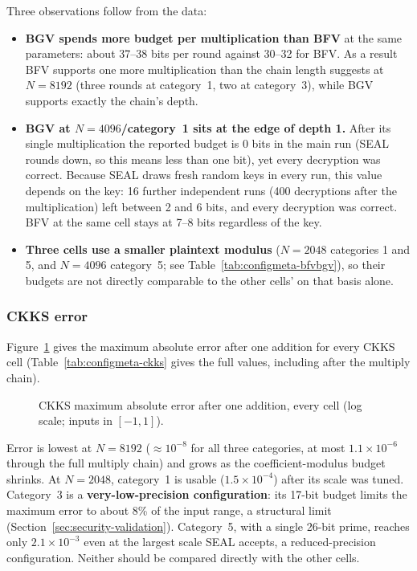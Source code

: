 Three observations follow from the data:
\begin{itemize}[leftmargin=*, itemsep=2pt]
  \item \textbf{BGV spends more budget per multiplication than BFV} at the same parameters: about 37--38 bits per round against 30--32 for BFV. As a result BFV supports one more multiplication than the chain length suggests at $N{=}8192$ (three rounds at category~1, two at category~3), while BGV supports exactly the chain's depth.
  \item \textbf{BGV at $N{=}4096$/category~1 sits at the edge of depth 1.} After its single multiplication the reported budget is 0 bits in the main run (SEAL rounds down, so this means less than one bit), yet every decryption was correct. Because SEAL draws fresh random keys in every run, this value depends on the key: 16 further independent runs (400 decryptions after the multiplication) left between 2 and 6 bits, and every decryption was correct. BFV at the same cell stays at 7--8 bits regardless of the key.
  \item \textbf{Three cells use a smaller plaintext modulus} ($N{=}2048$ categories 1 and 5, and $N{=}4096$ category~5; see Table~\ref{tab:configmeta-bfvbgv}), so their budgets are not directly comparable to the other cells' on that basis alone.
\end{itemize}

\subsubsection*{CKKS error}

Figure~\ref{fig:ckkserror} gives the maximum absolute error after one addition for every CKKS cell (Table~\ref{tab:configmeta-ckks} gives the full values, including after the multiply chain).

\begin{figure}[h!]
\centering

\caption{CKKS maximum absolute error after one addition, every cell (log scale; inputs in $[-1,1]$).}
\label{fig:ckkserror}
\end{figure}

Error is lowest at $N{=}8192$ ($\approx 10^{-8}$ for all three categories, at most $1.1{\times}10^{-6}$ through the full multiply chain) and grows as the coefficient-modulus budget shrinks. At $N{=}2048$, category~1 is usable ($1.5{\times}10^{-4}$) after its scale was tuned. Category~3 is a \textbf{very-low-precision configuration}: its 17-bit budget limits the maximum error to about 8\% of the input range, a structural limit (Section~\ref{sec:security-validation}). Category~5, with a single 26-bit prime, reaches only $2.1{\times}10^{-3}$ even at the largest scale SEAL accepts, a reduced-precision configuration. Neither should be compared directly with the other cells.

